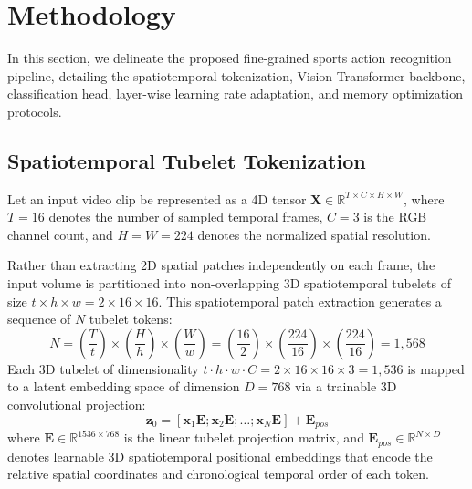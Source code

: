 \section{Methodology}
\label{sec:methodology}

In this section, we delineate the proposed fine-grained sports action recognition pipeline, detailing the spatiotemporal tokenization, Vision Transformer backbone, classification head, layer-wise learning rate adaptation, and memory optimization protocols.

\subsection{Spatiotemporal Tubelet Tokenization}
Let an input video clip be represented as a 4D tensor $\mathbf{X} \in \mathbb{R}^{T \times C \times H \times W}$, where $T=16$ denotes the number of sampled temporal frames, $C=3$ is the RGB channel count, and $H=W=224$ denotes the normalized spatial resolution. 

Rather than extracting 2D spatial patches independently on each frame, the input volume is partitioned into non-overlapping 3D spatiotemporal tubelets of size $t \times h \times w = 2 \times 16 \times 16$. This spatiotemporal patch extraction generates a sequence of $N$ tubelet tokens:
\begin{equation}
N = \left(\frac{T}{t}\right) \times \left(\frac{H}{h}\right) \times \left(\frac{W}{w}\right) = \left(\frac{16}{2}\right) \times \left(\frac{224}{16}\right) \times \left(\frac{224}{16}\right) = 1,568
\end{equation}
Each 3D tubelet of dimensionality $t \cdot h \cdot w \cdot C = 2 \times 16 \times 16 \times 3 = 1,536$ is mapped to a latent embedding space of dimension $D = 768$ via a trainable 3D convolutional projection:
\begin{equation}
\mathbf{z}_0 = [\mathbf{x}_1 \mathbf{E}; \mathbf{x}_2 \mathbf{E}; \dots; \mathbf{x}_N \mathbf{E}] + \mathbf{E}_{pos}
\end{equation}
where $\mathbf{E} \in \mathbb{R}^{1536 \times 768}$ is the linear tubelet projection matrix, and $\mathbf{E}_{pos} \in \mathbb{R}^{N \times D}$ denotes learnable 3D spatiotemporal positional embeddings that encode the relative spatial coordinates and chronological temporal order of each token.

